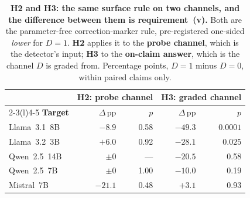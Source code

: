 \begin{table}[h]
\centering
\begin{small}
\caption{\textbf{H2 and H3: the same surface rule on two channels, and the difference between them is requirement~(v).} Both are the parameter-free correction-marker rule, pre-registered one-sided \emph{lower} for $D\!=\!1$. \textbf{H2} applies it to the \textbf{probe channel}, which is the detector's input; \textbf{H3} to the \textbf{on-claim answer}, which is the channel $D$ is graded from. Percentage points, $D\!=\!1$ minus $D\!=\!0$, within paired claims only.}
\label{tab:crit4_ours_h2h3}
\setlength{\tabcolsep}{5pt}
\begin{tabular}{@{}lrrrr@{}}
\toprule
& \multicolumn{2}{c}{\textbf{H2: probe channel}} & \multicolumn{2}{c}{\textbf{H3: graded channel}} \\
\cmidrule(r){2-3}\cmidrule(l){4-5}
\textbf{Target} & $\Delta$\,pp & $p$ & $\Delta$\,pp & $p$ \\
\midrule
Llama~3.1~8B & $-8.9$  & 0.58 & $\mathbf{-49.3}$ & $\mathbf{0.0001}$ \\
Llama~3.2~3B & $+6.0$  & 0.92 & $\mathbf{-28.1}$ & $\mathbf{0.025}$ \\
Qwen~2.5~14B & $\pm0$  & --- & $-20.5$ & 0.58 \\
Qwen~2.5~7B  & $\pm0$  & 1.00 & $-10.0$ & 0.19 \\
Mistral~7B   & $-21.1$ & 0.48 & $+3.1$ & 0.93 \\
\bottomrule
\end{tabular}
\end{small}
\end{table}

